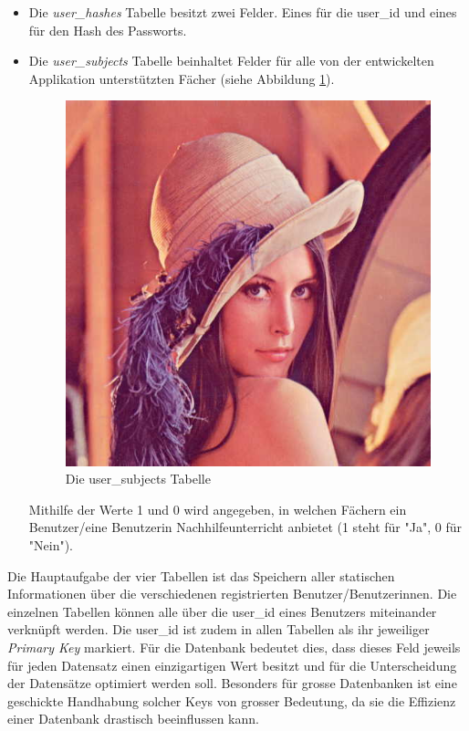 \documentclass[../main.tex]{subfiles}
\begin{document}
\begin{itemize}
		\item Die \emph{user\_hashes} Tabelle besitzt zwei Felder. Eines für die user\_id und eines für den Hash des Passworts.
		\item Die \emph{user\_subjects} Tabelle beinhaltet Felder für alle von der entwickelten Applikation unterstützten Fächer (siehe Abbildung \ref{user_subjects}). 
		\begin{figure} 
			\centering
			\includegraphics[width=\textwidth, height=0.5\textheight]{./images/lena.jpg}
			\caption{Die user\_subjects Tabelle}
			\label{user_subjects}
		\end{figure}
		Mithilfe der Werte 1 und 0 wird angegeben, in welchen Fächern ein Benutzer/eine Benutzerin Nachhilfeunterricht anbietet (1 steht für "Ja", 0 für "Nein").
	\end{itemize}
	
	 Die Hauptaufgabe der vier Tabellen ist das Speichern aller statischen Informationen über die verschiedenen registrierten Benutzer/Benutzerinnen. Die einzelnen Tabellen können alle über die user\_id eines Benutzers miteinander verknüpft werden. Die user\_id ist zudem in allen Tabellen als ihr jeweiliger \emph{Primary Key} markiert. Für die Datenbank bedeutet dies, dass dieses Feld jeweils für jeden Datensatz einen einzigartigen Wert besitzt und für die Unterscheidung der Datensätze optimiert werden soll. Besonders für grosse Datenbanken ist eine geschickte Handhabung solcher Keys von grosser Bedeutung, da sie die Effizienz einer Datenbank drastisch beeinflussen kann.
	
\end{document}
